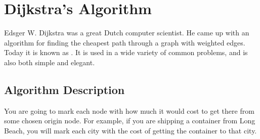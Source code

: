 \chapter{Dijkstra's Algorithm}

Edsger W. Dijkstra was a great Dutch computer scientist. He came up
with an algorithm for finding the cheapest path through a graph with
weighted edges. Today it is known as . It is used in a wide variety of common problems, and is
also both simple and elegant.

\section{Algorithm Description}

You are going to mark each node with how much it would cost to get
there from some chosen origin node.  For example, if you are shipping a
container from Long Beach, you will mark each city with the cost of
getting the container to that city.


